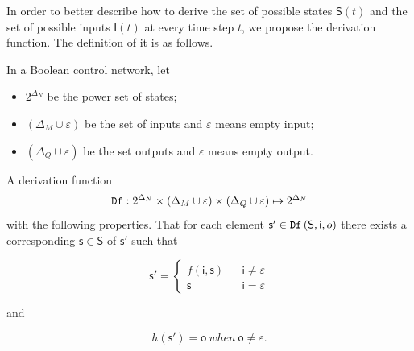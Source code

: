  
In order to better describe how to derive the set of possible states $\mathsf{S}(t)$ and the set of possible inputs $\mathsf{I}(t)$ at every time step $t$, we propose the derivation function. The definition of it is as follows.
\begin{definition} 
In a Boolean control network, let
\begin{itemize}
\item $2^{\Delta_N}$ be the power set of states; 
\item $(\Delta_M\cup\varepsilon)$ be the set of inputs and $\varepsilon$ means empty input; 
\item $(\Delta_Q\cup\varepsilon)$ be the set outputs and $\varepsilon$ means empty output.
\end{itemize} 
A derivation function \[{\tt Df}:2^{\Delta_N}\times (\Delta_M\cup\varepsilon) \times (\Delta_Q\cup\varepsilon) \mapsto 2^{\Delta_N}\] %
with the following properties. 
	That for each element $\mathsf{s}'\in {\tt Df}\left(\mathsf{S}, \mathsf{i}, {o}\right)$ there exists a corresponding $\mathsf{s}\in \mathsf{S}$ of $\mathsf{s}'$ such that 

\[\mathsf{s}'=\left\{
\begin{array}{rcl}
f( \mathsf{i}, \mathsf{s})      &      & {\mathsf{i}\neq \varepsilon}\\
\mathsf{s}       &      & {\mathsf{i}= \varepsilon}
\end{array} \right. \]

and 

\[h(\mathsf{s}')=\mathsf{o}\ when\ \mathsf{o}\neq \varepsilon.\]

\end{definition}


